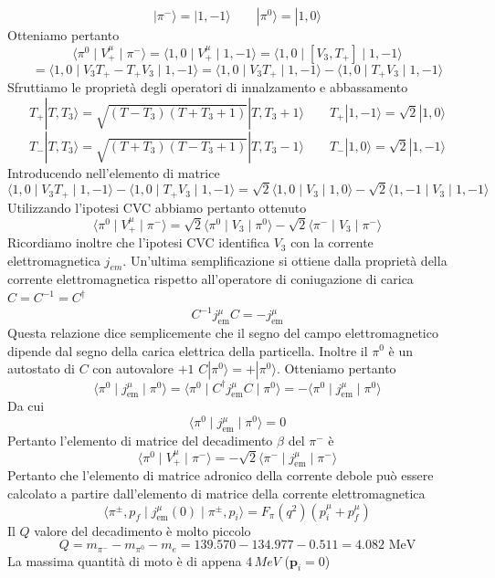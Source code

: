 $$
|\pi^-\rangle = |1, -1\rangle \quad \quad |\pi^0\rangle = |1, 0\rangle
$$
Otteniamo pertanto
$$
\langle \pi^0 \mid V_+^\mu \mid \pi^- \rangle = \langle 1, 0 \mid V_+^\mu \mid 1, -1 \rangle = \langle 1, 0 \mid [V_3, T_+] \mid 1, -1 \rangle
$$
$$
= \langle 1, 0 \mid V_3 T_+ - T_+ V_3 \mid 1, -1 \rangle = \langle 1, 0 \mid V_3 T_+ \mid 1, -1 \rangle - \langle 1, 0 \mid T_+ V_3 \mid 1, -1 \rangle
$$
Sfruttiamo le proprietà degli operatori di innalzamento e abbassamento
$$
T_+ |T, T_3\rangle = \sqrt{(T - T_3)(T + T_3 + 1)} |T, T_3 + 1\rangle \quad \quad T_+ |1, -1\rangle = \sqrt{2} |1, 0\rangle
$$
$$
T_- |T, T_3\rangle = \sqrt{(T + T_3)(T - T_3 + 1)} |T, T_3 - 1\rangle \quad \quad T_- |1, 0\rangle = \sqrt{2} |1, -1\rangle
$$
Introducendo nell'elemento di matrice
$$
\langle 1, 0 \mid V_3 T_+ \mid 1, -1 \rangle - \langle 1, 0 \mid T_+ V_3 \mid 1, -1 \rangle = \sqrt{2} \langle 1, 0 \mid V_3 \mid 1, 0 \rangle - \sqrt{2} \langle 1, -1 \mid V_3 \mid 1, -1 \rangle
$$
Utilizzando l'ipotesi CVC abbiamo pertanto ottenuto
$$
\langle \pi^0 \mid V_+^\mu \mid \pi^- \rangle = \sqrt{2} \langle \pi^0 \mid V_3 \mid \pi^0 \rangle - \sqrt{2} \langle \pi^- \mid V_3 \mid \pi^- \rangle
$$
Ricordiamo inoltre che l'ipotesi CVC identifica $V_3$ con la corrente elettromagnetica $j_{em}$. Un'ultima semplificazione si ottiene dalla proprietà della corrente elettromagnetica rispetto all'operatore di coniugazione di carica $C=C^{-1}=C^\dagger$
$$
C^{-1} j_{\text{em}}^\mu C = - j_{\text{em}}^\mu
$$
Questa relazione dice semplicemente che il segno del campo elettromagnetico dipende dal segno della carica elettrica della particella. Inoltre il $\pi^0$ è un autostato di $C$ con autovalore $+1$ $C|\pi^0\rangle=+|\pi^0\rangle$. Otteniamo pertanto
$$
\langle \pi^0 \mid j_{\text{em}}^\mu \mid \pi^0 \rangle = \langle \pi^0 \mid C^\dagger j_{\text{em}}^\mu C \mid \pi^0 \rangle = - \langle \pi^0 \mid j_{\text{em}}^\mu \mid \pi^0 \rangle
$$
Da cui
$$
\langle \pi^0 \mid j_{\text{em}}^\mu \mid \pi^0 \rangle = 0
$$
Pertanto l'elemento di matrice del decadimento $\beta$ del $\pi^-$ è
$$
\langle \pi^0 \mid V_+^\mu \mid \pi^- \rangle = -\sqrt{2} \langle \pi^- \mid j_{\text{em}}^\mu \mid \pi^- \rangle
$$
Pertanto che l'elemento di matrice adronico della corrente debole può essere calcolato a partire dall'elemento di matrice della corrente elettromagnetica
$$
\langle \pi^\pm, p_f \mid j_{\text{em}}^\mu (0) \mid \pi^\pm, p_i \rangle = F_\pi (q^2) (p_i^\mu + p_f^\mu)
$$
Il $Q$ valore del decadimento è molto piccolo
$$
Q = m_{\pi^-} - m_{\pi^0} - m_e = 139.570 - 134.977 - 0.511 = 4.082 \text{ MeV}
$$
La massima quantità di moto è di appena $4\,\unit{MeV}$ ($\mathbf{p}_i=0$)
